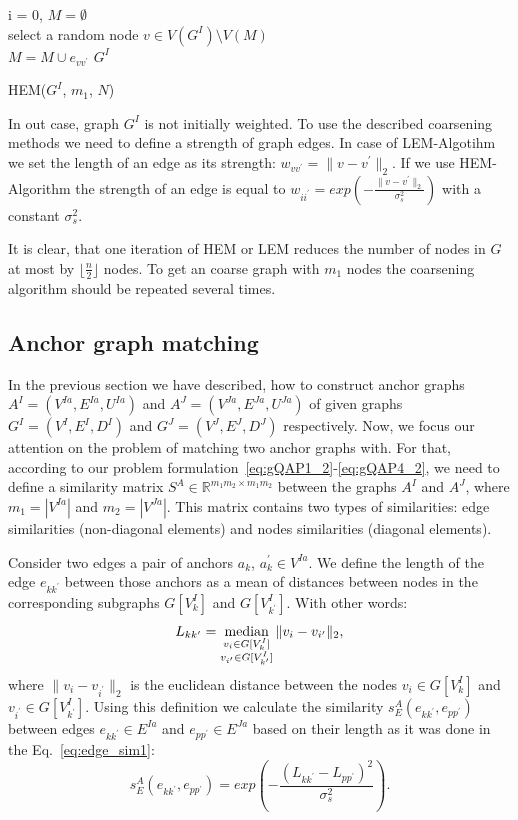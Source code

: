 \begin{algorithm}[h]
	i = 0, $M=\emptyset$ \\
	{ select a random node $v\in V(G^I)\setminus V(M)$ \\
	  {$M=M\cup{e_{vv^\prime}}$}
	}
	\Return $G^I$
	\caption{HEM($G^I$, $m_1$, $N$)} \label{alg:HEM}
\end{algorithm}

In out case, graph $G^I$ is not initially weighted. To use the described coarsening methods we need to define a strength of graph edges. In case of LEM-Algotihm we set the length of an edge as its strength: $w_{vv^\prime}=\|v-v^\prime\|_{2}$. If we use HEM-Algorithm the strength of an edge is equal to $w_{ii^\prime} = exp(-\frac{\|v-v^\prime\|_{2}}{\sigma^2_{s}})$ with a constant $\sigma^2_{s}$.

It is clear, that one iteration of HEM or LEM reduces the number of nodes in $G$ at most by $\lfloor\frac{n}{2} \rfloor$ nodes. To get an coarse graph with $m_1$ nodes the coarsening algorithm should be repeated several times.

\subsection{Anchor graph matching}
In the previous section we have described, how to construct anchor graphs $A^I=(V^{Ia},E^{Ia}, U^{Ia})$ and $A^J=(V^{Ja},E^{Ja},U^{Ja})$ of given graphs $G^I = (V^I, E^I, D^I)$ and $G^J=(V^J, E^J, D^J)$ respectively. Now, we focus our attention on the problem of matching two anchor graphs with. For that, according to our problem formulation~\eqref{eq:gQAP1_2}-\eqref{eq:gQAP4_2}, we need to define a similarity matrix $S^A\in\mathbb{R}^{m_1m_2\times m_1m_2}$ between the graphs $A^I$ and $A^J$, where $m_1=|V^{Ia}|$ and $m_2=|V^{Ja}|$. This matrix contains two types of similarities: edge similarities (non-diagonal elements) and nodes similarities (diagonal elements).

Consider two edges a pair of anchors  $a_k$, $a_k^\prime\in V^{Ia}$. We define the length of the edge $e_{kk^{\prime}}$ between those anchors as a mean of distances between nodes in the corresponding subgraphs $G[V^I_k]$ and $G[V^I_{k^\prime}]$. With other words:
\begin{equation} L_{kk^\prime} = \mathop{\rm median}_{\substack{v_i\in G[V^I_k]\\ v_{i^\prime}\in G[V^I_{k^\prime}]} }\|v_i-v_{i^\prime}\|_{2}, \end{equation}
where $\|v_i-v_{i^\prime}\|_{2}$ is the euclidean distance between the nodes $v_i\in G[V^I_k]$ and $v_{i^\prime}\in G[V^I_{k^\prime}]$.
Using this definition we calculate the similarity $s^A_E(e_{kk^\prime}, e_{pp^\prime})$ between edges $e_{kk^\prime}\in E^{Ia}$ and $e_{pp^\prime}\in E^{Ja}$ based on their length as it was done in the Eq.~\eqref{eq:edge_sim1}:
\begin{equation*}
s^A_E(e_{kk^\prime}, e_{pp^\prime}) = exp(-\frac{(L_{kk^\prime} - L_{pp^\prime})^2}{\sigma^2_{s}}).
\label{eq:s_e_A}
\end{equation*}


